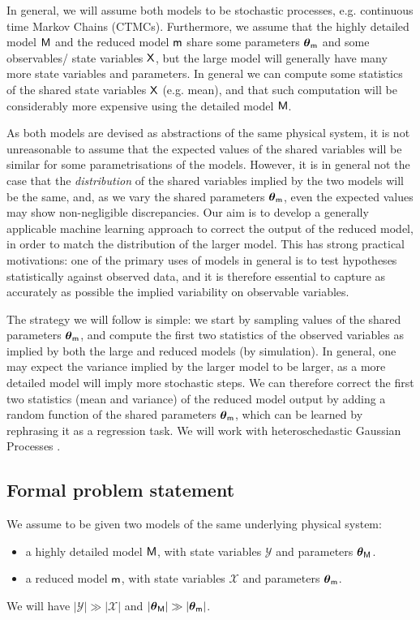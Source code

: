 \documentclass[runningheads,a4paper]{llncs}
\newcommand{\bM}{{\sf{M}}}
\newcommand{\bm}{{\sf{m}}}
\newcommand{\cvar}{{\sf{X}}}
\newcommand{\pmpar}{\bth_{\sf{m}}}
\newcommand{\pMpar}{\bth_{\sf{M}}}
\newcommand{\bth}{\boldsymbol{\theta}}
\begin{document}
In general, we will assume both models to be stochastic processes, e.g. continuous time Markov Chains (CTMCs). Furthermore, we assume that the highly detailed model $\bM$ and the reduced model $\bm$ share some parameters $\pmpar$ and some observables/ state variables $\cvar$, but the large model will generally have many more state variables and parameters.  In general we can compute some statistics of the shared state variables $\cvar$ (e.g. mean), and that such computation will be considerably more expensive using the detailed model $\bM$.

As both models are devised as abstractions of the same physical system, it is not unreasonable to assume that the expected values of the shared variables will be similar for some parametrisations of the models. However, it is in general not the case that the {\it distribution} of the shared variables implied by the two models will be the same, and, as we vary the shared parameters $\pmpar$, even the expected values may show non-negligible discrepancies. Our aim is to develop a generally applicable machine learning approach to correct the output of the reduced model, in order to match the distribution of the larger model. This has strong practical motivations: one of the primary uses of models in general is to test hypotheses statistically against observed data, and it is therefore essential to capture as accurately as possible the implied variability on observable variables.

The strategy we will follow is simple: we start by sampling values of the shared parameters $\pmpar$, and compute the first two statistics of the observed variables as implied by both the large and reduced models (by simulation). In general, one may expect the variance implied by the larger model to be larger, as a more detailed model will imply more stochastic steps. We can therefore correct the first two statistics (mean and variance) of the reduced model output by adding a random function of the shared parameters $ \bth_{\bm}$, which can be learned by rephrasing it as a regression task. We will work with heteroschedastic Gaussian Processes  \cite{lucaQEST13}.

\subsection{Formal problem statement}

We assume to be given two models of the same underlying physical system:
\begin{itemize}
	\item a highly detailed model $\bM$, with state variables $\mathcal{Y}$ and parameters $\pMpar$. 
	\item a reduced model $\bm$, with state variables $\mathcal{X}$ and parameters $\pmpar$. 
\end{itemize}
We will have $|\mathcal{Y}| \gg |\mathcal{X}|$ and $|\pMpar| \gg | \pmpar|$.
 
\end{document}

